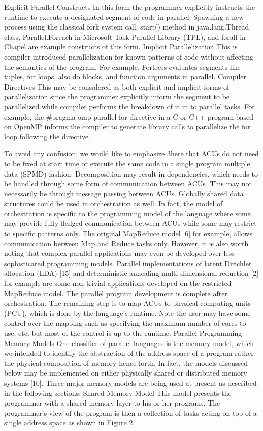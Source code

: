 	Explicit Parallel Constructs
In this form the programmer explicitly instructs the runtime to execute a designated segment of code in parallel. Spawning a new process using the classical fork system call, start() method in java.lang.Thread class, Parallel.Foreach in Microsoft Task Parallel Library (TPL), and forall in Chapel are example constructs of this form.
	Implicit Parallelization
	This is compiler introduced parallelization for known patterns of code without affecting the semantics of the program. For example, Fortress evaluates segments like tuples, for loops, also do blocks, and function arguments in parallel.
	Compiler Directives
	This may be considered as both explicit and implicit forms of parallelization since the programmer explicitly inform the segment to be parallelized while compiler performs the breakdown of it in to parallel tasks. For example, the \#pragma omp parallel for directive in a C or C++ program based on OpenMP informs the compiler to generate library calls to parallelize the for loop following the directive.
    
To avoid any confusion, we would like to emphasize 3here that ACUs do not need to be fixed at start time or execute the same code in a single program multiple data (SPMD) fashion.
Decomposition may result in dependencies, which needs to be handled through some form of communication between ACUs. This may not necessarily be through message passing between ACUs. Globally shared data structures could be used in orchestration as well. In fact, the model of orchestration is specific to the programming model of the language where some may provide fully-fledged communication between ACUs while some may restrict to specific patterns only. The original MapReduce model [6]  for example, allows communication between Map and Reduce tasks only. However, it is also worth noting that complex parallel applications may even be developed over less sophisticated programming models. Parallel implementations of latent Dirichlet allocation (LDA) [15] and deterministic annealing multi-dimensional reduction [2] for example are some non-trivial applications developed on the restricted MapReduce model.
The parallel program development is complete after orchestration. The remaining step is to map ACUs to physical computing units (PCU), which is done by the language’s runtime. Note the user may have some control over the mapping such as specifying the maximum number of cores to use, etc. but most of the control is up to the runtime. 
Parallel Programming Memory Models
One classifier of parallel languages is the memory model, which we intended to identify the abstraction of the address space of a program rather the physical composition of memory hence-forth. In fact, the models discussed below may be implemented on either physically shared or distributed memory systems [10]. Three major memory models are being used at present as described in the following sections.
Shared Memory Model
This model presents the programmer with a shared memory layer to his or her programs. The programmer’s view of the program is then a collection of tasks acting on top of a single address space as shown in Figure 2.
 
